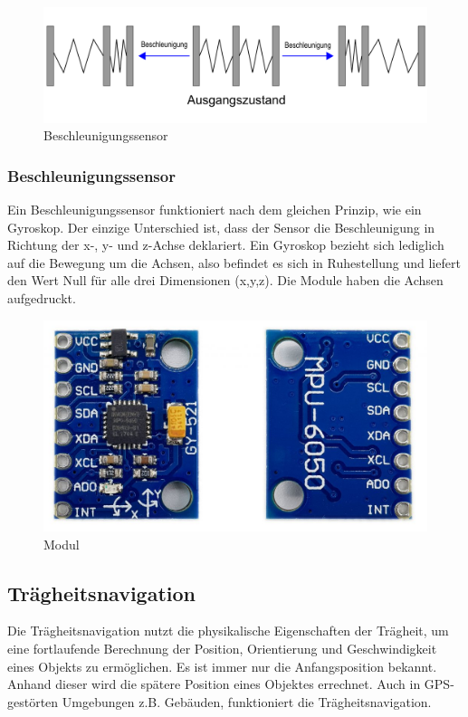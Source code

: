 \begin{figure}[H]
	\centering
	\includegraphics[width=0.7\linewidth]{images/Beschleunigungssensor.png}
	\caption[Beschleunigungssensor]{Beschleunigungssensor}
	\label{fig:Beschleunigungssensor}
\end{figure}

\subsubsection{Beschleunigungssensor}

Ein Beschleunigungssensor funktioniert nach dem gleichen Prinzip, wie ein Gyroskop. Der einzige Unterschied ist, dass der Sensor die Beschleunigung in Richtung der x-, y- und z-Achse deklariert. Ein Gyroskop bezieht sich lediglich auf die Bewegung um die Achsen, also befindet es sich in Ruhestellung und liefert den Wert Null für alle drei Dimensionen (x,y,z). \textcite{MPU6050} Die Module haben die Achsen aufgedruckt.

\begin{figure}[H]
	\centering
	\includegraphics[width=0.7\linewidth]{images/Modul.jpg}
	\caption[Modul]{Modul}
	\label{fig:Modul}
\end{figure}

\subsection{Trägheitsnavigation}
\label{Trägheitsnavigation}

Die Trägheitsnavigation nutzt die physikalische Eigenschaften der Trägheit, um eine fortlaufende Berechnung der Position, Orientierung und Geschwindigkeit eines Objekts zu ermöglichen. \parencite{Traegheitsnavigation} Es ist immer nur die Anfangsposition bekannt. Anhand dieser wird die spätere Position eines Objektes errechnet. Auch in GPS-gestörten Umgebungen z.B. Gebäuden, funktioniert die Trägheitsnavigation. 


